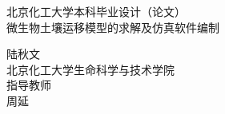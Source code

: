 \begin{titlepage}
\thispagestyle{empty}
\newcommand{\HRule}{\rule{\linewidth}{0.5mm}} %

\center %
 

\vspace*{1.2cm}
\textsc{ 北京化工大学本科毕业设计（论文）}\\[2.8cm] %


\vspace*{1.2cm}
{\heiti{} 微生物土壤运移模型的求解及仿真软件编制}\\[1cm] %
\vspace*{1.2cm}
 

{\kaishu\large
陆秋文\\
北京化工大学生命科学与技术学院\\[0.5cm]}
指导教师\\
{\large\kaishu 周\quad 延}


\end{titlepage}
